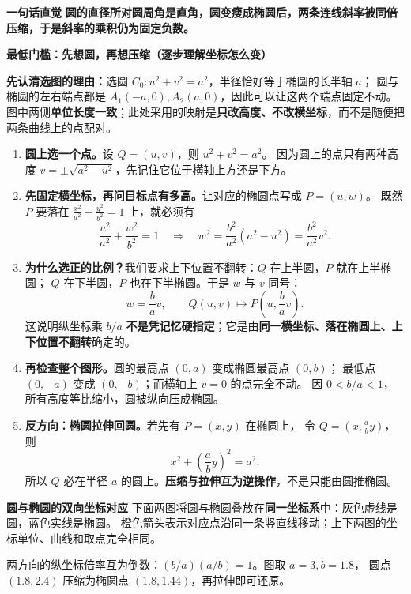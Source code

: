 \begin{explanationbox}
\textbf{\textcolor{CExplanation}{一句话直觉}}
\textbf{圆的直径所对圆周角是直角，圆变瘦成椭圆后，两条连线斜率被同倍压缩，于是斜率的乘积仍为固定负数。}

\medskip
\begin{minipage}{\linewidth}
\textbf{\textcolor{CExplanation}{最低门槛：先想圆，再想压缩（逐步理解坐标怎么变）}}

\end{minipage}
\textbf{先认清选图的理由：}选圆 $C_0:u^2+v^2=a^2$，半径恰好等于椭圆的长半轴 $a$；
圆与椭圆的左右端点都是 $A_1(-a,0),A_2(a,0)$，因此可以让这两个端点固定不动。
图中两侧\textbf{单位长度一致}；此处采用的映射是\textbf{只改高度、不改横坐标}，而不是随便把两条曲线上的点配对。

\begin{enumerate}[leftmargin=*,itemsep=0.45em,topsep=0.35em]
 \item \textbf{圆上选一个点。}设 $Q=(u,v)$，则 $u^2+v^2=a^2$。
  因为圆上的点只有两种高度 $v=\pm\sqrt{a^2-u^2}$，先记住它位于横轴上方还是下方。
 \item \textbf{先固定横坐标，再问目标点有多高。}让对应的椭圆点写成 $P=(u,w)$。
  既然 $P$ 要落在 $\frac{x^2}{a^2}+\frac{y^2}{b^2}=1$ 上，就必须有
  \[
   \frac{u^2}{a^2}+\frac{w^2}{b^2}=1
   \quad\Longrightarrow\quad
   w^2=\frac{b^2}{a^2}(a^2-u^2)=\frac{b^2}{a^2}v^2.
  \]
 \item \textbf{为什么选正的比例？}我们要求上下位置不翻转：$Q$ 在上半圆，$P$ 就在上半椭圆；
  $Q$ 在下半圆，$P$ 也在下半椭圆。于是 $w$ 与 $v$ 同号：
  \[
    \boxed{w=\frac ba v},\qquad \boxed{Q(u,v)\mapsto P\left(u,\frac ba v\right)}.
  \]
  这说明纵坐标乘 $b/a$ \textbf{不是凭记忆硬指定}；它是由\textbf{同一横坐标、落在椭圆上、上下位置不翻转}确定的。
 \item \textbf{再检查整个图形。}圆的最高点 $(0,a)$ 变成椭圆最高点 $(0,b)$；
  最低点 $(0,-a)$ 变成 $(0,-b)$；而横轴上 $v=0$ 的点完全不动。
  因 $0<b/a<1$，所有高度等比缩小，圆被纵向压成椭圆。
 \item \textbf{反方向：椭圆拉伸回圆。}若先有 $P=(x,y)$ 在椭圆上，
  令 $Q=(x,\frac ab y)$，则
  \[
    x^2+\left(\frac ab y\right)^2=a^2.
  \]
  所以 $Q$ 必在半径 $a$ 的圆上。\textbf{压缩与拉伸互为逆操作}，不是只能由圆推椭圆。
\end{enumerate}

\medskip
\textbf{\textcolor{CExplanation}{圆与椭圆的双向坐标对应}}
下面两图将圆与椭圆叠放在\textbf{同一坐标系}中：灰色虚线是圆，蓝色实线是椭圆。
橙色箭头表示对应点沿同一条竖直线移动；上下两图的坐标单位、曲线和取点完全相同。


两方向的纵坐标倍率互为倒数：$(b/a)(a/b)=1$。图取 $a=3,b=1.8$，
圆点 $(1.8,2.4)$ 压缩为椭圆点 $(1.8,1.44)$，再拉伸即可还原。


\end{explanationbox}

